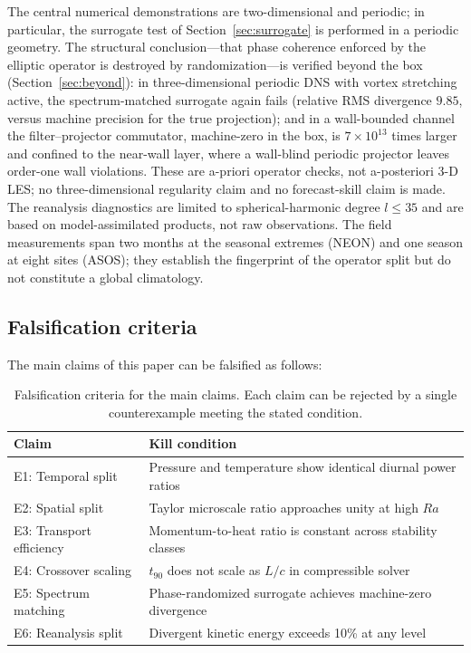 \documentclass[aps,prfluids,preprint,superscriptaddress,nofootinbib]{revtex4-2}
\begin{document}
The central numerical demonstrations are two-dimensional and periodic; in particular, the surrogate test of Section~\ref{sec:surrogate} is performed in a periodic geometry. The structural conclusion---that phase coherence enforced by the elliptic operator is destroyed by randomization---is verified beyond the box (Section~\ref{sec:beyond}): in three-dimensional periodic DNS with vortex stretching active, the spectrum-matched surrogate again fails (relative RMS divergence $9.85$, versus machine precision for the true projection); and in a wall-bounded channel the filter--projector commutator, machine-zero in the box, is $7\times10^{13}$ times larger and confined to the near-wall layer, where a wall-blind periodic projector leaves order-one wall violations. These are a-priori operator checks, not a-posteriori 3-D LES; no three-dimensional regularity claim and no forecast-skill claim is made. The reanalysis diagnostics are limited to spherical-harmonic degree $l \leq 35$ and are based on model-assimilated products, not raw observations. The field measurements span two months at the seasonal extremes (NEON) and one season at eight sites (ASOS); they establish the fingerprint of the operator split but do not constitute a global climatology.

\subsection{Falsification criteria}

The main claims of this paper can be falsified as follows:

\begin{table}[t]
\centering
\caption{Falsification criteria for the main claims. Each claim can be rejected by a single counterexample meeting the stated condition.}
\label{tab:kill}
\begin{tabular}{ll}
\toprule
Claim & Kill condition \\
\midrule
E1: Temporal split & Pressure and temperature show identical diurnal power ratios \\
E2: Spatial split & Taylor microscale ratio approaches unity at high $Ra$ \\
E3: Transport efficiency & Momentum-to-heat ratio is constant across stability classes \\
E4: Crossover scaling & $t_{90}$ does not scale as $L/c$ in compressible solver \\
E5: Spectrum matching & Phase-randomized surrogate achieves machine-zero divergence \\
E6: Reanalysis split & Divergent kinetic energy exceeds 10\% at any level \\
\bottomrule
\end{tabular}
\end{table}
\end{document}
